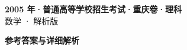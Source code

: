 \documentclass[zihao=-4, a4paper]{ctexart}
\begin{document}
\begin{center}
  {\Large\bfseries 2005 年·普通高等学校招生考试·重庆卷·理科}\\[4pt]
  {\large 数学 · 解析版}
\end{center}
\medskip
{}

\clearpage
{}
\begin{center}{\Large\bfseries 参考答案与详细解析}\end{center}
\medskip

\end{document}
